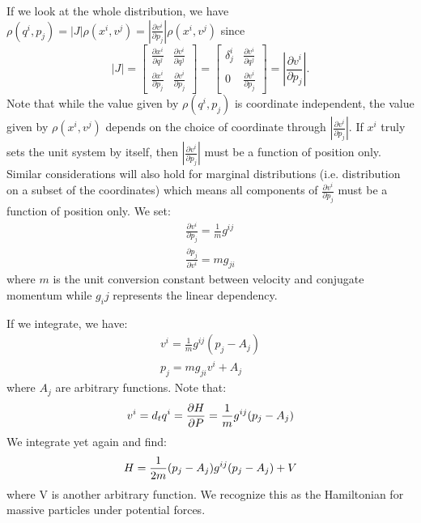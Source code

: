 \documentclass[letterpaper]{article}
\begin{document}
If we look at the whole distribution, we have $\rho(q^i, p_j) = |J| \rho(x^i, v^j) = \left|\frac{\partial v^i}{\partial p_j}\right| \rho(x^i, v^j)$ since
\begin{equation}
|J| = \begin{bmatrix}
\frac{\partial x^i}{\partial q^j} & \frac{\partial v^i}{\partial q^j} \\
\frac{\partial x^i}{\partial p_j} & \frac{\partial v^i}{\partial p_j}
\end{bmatrix}
= \begin{bmatrix}
\delta^i_j & \frac{\partial v^i}{\partial q^j} \\
0 & \frac{\partial v^i}{\partial p_j}
\end{bmatrix}
= \left|\frac{\partial v^i}{\partial p_j}\right|.
\end{equation}
Note that while the value given by $\rho(q^i, p_j)$ is coordinate independent, the value given by $\rho(x^i, v^j)$ depends on the choice of coordinate through $\left|\frac{\partial v^i}{\partial p_j}\right|$. If $x^i$ truly sets the unit system by itself, then $\left|\frac{\partial v^i}{\partial p_j}\right|$ must be a function of position only. Similar considerations will also hold for marginal distributions (i.e. distribution on a subset of the coordinates) which means all components of $\frac{\partial v^i}{\partial p_j}$ must be a function of position only. We set:
\begin{equation}
\begin{aligned}
\frac{\partial v^i}{\partial p_j} = \frac{1}{m} g^{ij} \\
\frac{\partial p_j}{\partial v^i} = m g_{ji}
\end{aligned}
\end{equation}
where $m$ is the unit conversion constant between velocity and conjugate momentum while $g_ij$ represents the linear dependency.

If we integrate, we have:
\begin{equation}
\begin{aligned}
v^i = \frac{1}{m} g^{ij}(p_j - A_j) \\
p_j = m g_{ji} v^i + A_j
\end{aligned}
\end{equation}
where $A_j$ are arbitrary functions. Note that:
\begin{equation}
v^i = d_t q^i = \frac{\partial H }{\partial P} = \frac{1}{m} g^{ij}(p_j - A_j) \\
\end{equation}
We integrate yet again and find:
\begin{equation}
H = \frac{1}{2m} (p_j - A_j) g^{ij}(p_j - A_j) + V \\
\end{equation}
where V is another arbitrary function. We recognize this as the Hamiltonian for massive particles under potential forces.
\end{document}
